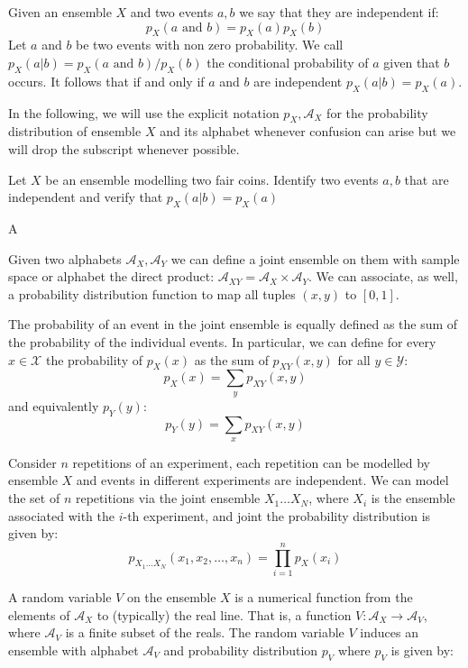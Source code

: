 Given an ensemble $X$ and two events $a,b$ we say that they are independent if:
\begin{equation}
p_X(a \text{ and } b)=p_X(a)p_X(b)
\end{equation}
Let $a$ and $b$ be two events with non zero probability. We call $p_X(a|b)=p_X(a \text{ and } b)/p_X(b)$ the conditional probability of $a$ given that $b$ occurs. It follows that if and only if $a$ and $b$ are independent $p_X(a|b)=p_X(a)$.

In the following, we will use the explicit notation $p_X,\mathcal A_X$ for the probability distribution of ensemble $X$ and its alphabet whenever confusion can arise but we will drop the subscript whenever possible.
\begin{exercise}
Let $X$ be an ensemble modelling two fair coins. Identify two events $a,b$ that are independent and verify that $p_X(a|b)=p_X(a)$
\end{exercise}
\begin{solution}
A
\end{solution}
Given two alphabets $\mathcal A_X,\mathcal A_Y$ we can define a joint ensemble on them with sample space or alphabet the direct product: $\mathcal A_{XY} = \mathcal A_X \times \mathcal A_Y$. 
We can associate, as well, a probability distribution function to map all tuples $(x,y)$ to $[0,1]$. 

The probability of an event in the joint ensemble is equally defined as the sum of the probability of the individual events. 
In particular, we can define for every $x\in\mathcal X$ the probability of $p_X(x)$ as the sum of $p_{XY}(x,y)$ for all $y\in\mathcal Y$:
\begin{equation}
p_X(x)=\sum_{y}p_{XY}(x,y)
\end{equation} 
\noindent and equivalently $p_Y(y)$:
\begin{equation}
p_Y(y)=\sum_{x}p_{XY}(x,y)
\end{equation} 
\begin{example}
Consider $n$ repetitions of an experiment, each repetition can be modelled by ensemble $X$ and events in different experiments are independent. We can model the set of $n$ repetitions via the joint ensemble $X_1\ldots X_N$, where $X_i$ is the ensemble associated with the $i$-th experiment, and joint the probability distribution is given by:
\begin{equation}
p_{X_1\ldots X_N}(x_1,x_2,\ldots,x_n)=\prod_{i=1}^np_X(x_i)
\end{equation}
\end{example}
A random variable $V$ on the ensemble $X$ is a numerical function from the elements of $\mathcal A_X$ to (typically) the real line. That is, a function $V:\mathcal{A}_X\rightarrow \mathcal A_V$, where $\mathcal A_V$ is a finite subset of the reals. The random variable $V$ induces an ensemble with alphabet $\mathcal A_V$ and probability distribution $p_V$ where $p_V$ is given by:

